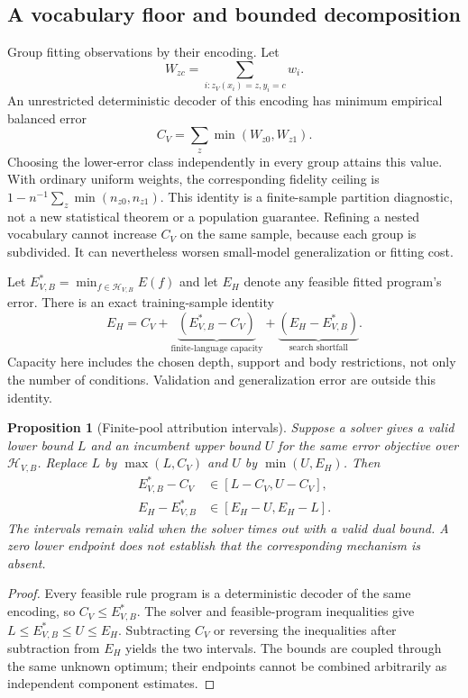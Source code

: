 \documentclass[review,12pt]{elsarticle}
\newtheorem{proposition}{Proposition}
\begin{document}
\subsection{A vocabulary floor and bounded decomposition}\label{sec:vocabulary-ceiling}
Group fitting observations by their encoding. Let
\[
 W_{zc}=\sum_{i:z_V(x_i)=z,y_i=c}w_i.
\]
An unrestricted deterministic decoder of this encoding has minimum empirical balanced error
\begin{equation}
 C_V=\sum_z\min(W_{z0},W_{z1}).\label{eq:collision}
\end{equation}
Choosing the lower-error class independently in every group attains this value. With ordinary uniform weights, the corresponding fidelity ceiling is $1-n^{-1}\sum_z\min(n_{z0},n_{z1})$. This identity is a finite-sample partition diagnostic, not a new statistical theorem or a population guarantee. Refining a nested vocabulary cannot increase $C_V$ on the same sample, because each group is subdivided. It can nevertheless worsen small-model generalization or fitting cost.

Let $E^*_{V,B}=\min_{f\in\mathcal H_{V,B}} E(f)$ and let $E_H$ denote any feasible fitted program's error. There is an exact training-sample identity
\begin{equation}
 E_H=C_V+\underbrace{(E^*_{V,B}-C_V)}_{\text{finite-language capacity}}+
                \underbrace{(E_H-E^*_{V,B})}_{\text{search shortfall}}.\label{eq:decomposition}
\end{equation}
Capacity here includes the chosen depth, support and body restrictions, not only the number of conditions. Validation and generalization error are outside this identity.

\begin{proposition}[Finite-pool attribution intervals]\label{prop:intervals}
Suppose a solver gives a valid lower bound $L$ and an incumbent upper bound $U$ for the same error objective over $\mathcal H_{V,B}$. Replace $L$ by $\max(L,C_V)$ and $U$ by $\min(U,E_H)$. Then
\begin{align}
 E^*_{V,B}-C_V&\in[L-C_V,U-C_V],\\
 E_H-E^*_{V,B}&\in[E_H-U,E_H-L].\label{eq:intervals}
\end{align}
The intervals remain valid when the solver times out with a valid dual bound. A zero lower endpoint does not establish that the corresponding mechanism is absent.
\end{proposition}
\begin{proof}
Every feasible rule program is a deterministic decoder of the same encoding, so $C_V\leq E^*_{V,B}$. The solver and feasible-program inequalities give $L\leq E^*_{V,B}\leq U\leq E_H$. Subtracting $C_V$ or reversing the inequalities after subtraction from $E_H$ yields the two intervals. The bounds are coupled through the same unknown optimum; their endpoints cannot be combined arbitrarily as independent component estimates.
\end{proof}
\end{document}
